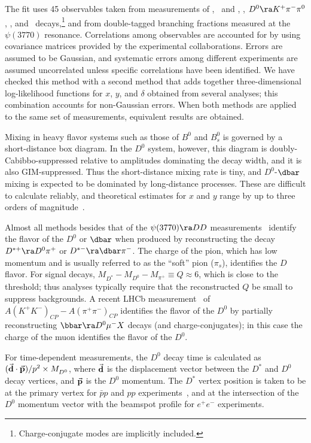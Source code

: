 The fit uses 45 observables taken from 
measurements of \dklnu, \dkk\ and \dpipi, \dkpi, 
$D^0\ra K^+\pi^-\pi^0$, %
\dkspp, and \dkskk\ decays,\footnote{Charge-conjugate modes
are implicitly included.} and from double-tagged branching 
fractions measured at the $\psi(3770)$ resonance. Correlations 
among observables are accounted for by using covariance matrices 
provided by the experimental collaborations. Errors are assumed
to be Gaussian, and systematic errors among different experiments 
are assumed uncorrelated unless specific correlations have been 
identified.
We have checked this method with a second method that adds
together three-dimensional log-likelihood functions 
for $x$, $y$, and $\delta$ obtained from several analyses;
this combination accounts for non-Gaussian errors.
When both methods are applied to the same set of 
measurements, equivalent results are obtained. 


Mixing in heavy flavor systems such as those of $B^0$ and $B^0_s$ 
is governed by a short-distance box diagram. In the $D^0$ system,
however, this diagram is doubly-Cabibbo-suppressed relative to 
amplitudes dominating the decay width, and it is also GIM-suppressed.
Thus the short-distance mixing rate is tiny, and $D^0$-$\dbar$ 
mixing is expected to be dominated by long-distance processes. 
These are difficult to calculate reliably, and theoretical
estimates for $x$ and $y$ range by up to three orders of 
magnitude~\cite{Bigi:2000wn,Petrov:2003un,Petrov:2004rf,Falk:2004wg}.

Almost all methods besides that of the $\psi(3770)\ra DD$
measurements~\cite{Asner:2012xb} identify the flavor of the
$D^0$ or $\dbar$ when produced by reconstructing the decay
$D^{*+}\ra D^0\pi^+$ or $D^{*-}\ra\dbar\pi^-$. The charge
of the pion, which has low momentum and is usually 
referred to as the ``soft'' pion ($\pi^{}_s$),
identifies the $D$ flavor. For signal 
decays, $M^{}_{D^*}-M^{}_{D^0}-M^{}_{\pi^+}\equiv Q\approx 6$\meve, 
which is close to the threshold; thus analyses typically
require that the reconstructed $Q$ be small to suppress backgrounds. 
A recent LHCb measurement~\cite{Aaij:2014gsa} of 
$A(K^+K^-)_{CP} - A(\pi^+\pi^-)_{CP}$ identifies the flavor of
the $D^0$ by partially reconstructing $\bbar\ra D^0\mu^- X$ 
decays (and charge-conjugates); in this case the charge of
the muon identifies the flavor of the $D^0$.

For time-dependent measurements, the $D^0$ decay time is 
calculated as 
$(\vec{\bf d}\cdot\vec{\bf p})/p^2\times M^{}_{D^0}$, 
where $\vec{\bf d}$ is the displacement vector between the
$D^*$ and $D^0$ decay vertices, and $\vec{\bf p}$ is the
$D^0$ momentum. The $D^*$ vertex position is 
taken to be at the primary vertex for $\bar{p}p$ and $pp$
experiments~\cite{Aaltonen:2007uc,Aaij:2013wda}, and at
the intersection of the $D^0$ momentum vector with the
beamspot profile for $e^+e^-$ experiments.


